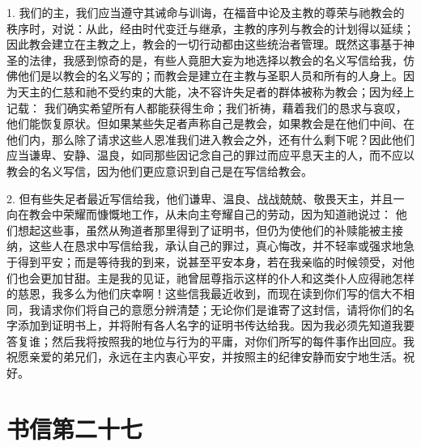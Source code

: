 1. 我们的主，我们应当遵守其诫命与训诲，在福音中论及主教的尊荣与祂教会的秩序时，对说：从此，经由时代变迁与继承，主教的序列与教会的计划得以延续；因此教会建立在主教之上，教会的一切行动都由这些统治者管理。既然这事基于神圣的法律，我感到惊奇的是，有些人竟胆大妄为地选择以教会的名义写信给我，仿佛他们是以教会的名义写的；而教会是建立在主教与圣职人员和所有的人身上。因为天主的仁慈和祂不受约束的大能，决不容许失足者的群体被称为教会；因为经上记载： 我们确实希望所有人都能获得生命；我们祈祷，藉着我们的恳求与哀叹，他们能恢复原状。但如果某些失足者声称自己是教会，如果教会是在他们中间、在他们内，那么除了请求这些人恩准我们进入教会之外，还有什么剩下呢？因此他们应当谦卑、安静、温良，如同那些因记念自己的罪过而应平息天主的人，而不应以教会的名义写信，因为他们更应意识到自己是在写信给教会。\par

2. 但有些失足者最近写信给我，他们谦卑、温良、战战兢兢、敬畏天主，并且一向在教会中荣耀而慷慨地工作，从未向主夸耀自己的劳动，因为知道祂说过： 他们想起这些事，虽然从殉道者那里得到了证明书，但仍为使他们的补赎能被主接纳，这些人在恳求中写信给我，承认自己的罪过，真心悔改，并不轻率或强求地急于得到平安；而是等待我的到来，说甚至平安本身，若在我亲临的时候领受，对他们也会更加甘甜。主是我的见证，祂曾屈尊指示这样的仆人和这类仆人应得祂怎样的慈恩，我多么为他们庆幸啊！这些信我最近收到，而现在读到你们写的信大不相同，我请求你们将自己的意愿分辨清楚；无论你们是谁寄了这封信，请将你们的名字添加到证明书上，并将附有各人名字的证明书传达给我。因为我必须先知道我要答复谁；然后我将按照我的地位与行为的平庸，对你们所写的每件事作出回应。我祝愿亲爱的弟兄们，永远在主内衷心平安，并按照主的纪律安静而安宁地生活。祝好。\par



\section{书信第二十七}

